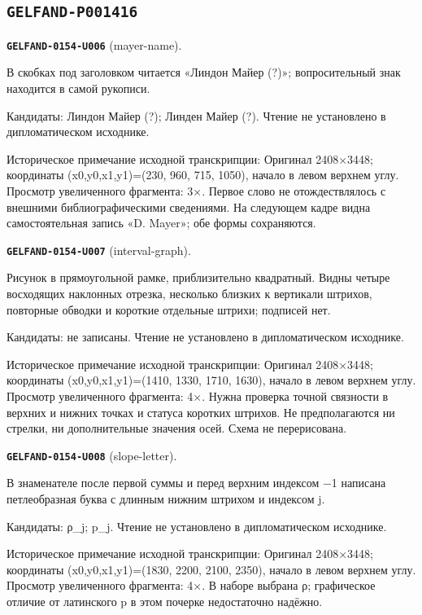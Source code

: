 \subsection*{\texttt{GELFAND-P001416}}
\par\noindent\leavevmode{}\label{GELFAND-0154-U006}\textbf{\texttt{GELFAND-0154-U006}} (mayer-name).\nopagebreak[4]\par
В скобках под заголовком читается «Линдон Майер (?)»; вопросительный знак находится в самой рукописи.\par
Кандидаты: Линдон Майер (?); Линден Майер (?). Чтение не установлено в дипломатическом исходнике.\par
Историческое примечание исходной транскрипции: Оригинал 2408×3448; координаты (x0,y0,x1,y1)=(230, 960, 715, 1050), начало в левом верхнем углу. Просмотр увеличенного фрагмента: 3×. Первое слово не отождествлялось с внешними библиографическими сведениями. На следующем кадре видна самостоятельная запись «D. Mayer»; обе формы сохраняются.\par\medskip
\par\noindent\leavevmode{}\label{GELFAND-0154-U007}\textbf{\texttt{GELFAND-0154-U007}} (interval-graph).\nopagebreak[4]\par
Рисунок в прямоугольной рамке, приблизительно квадратный. Видны четыре восходящих наклонных отрезка, несколько близких к вертикали штрихов, повторные обводки и короткие отдельные штрихи; подписей нет.\par
Кандидаты: не записаны. Чтение не установлено в дипломатическом исходнике.\par
Историческое примечание исходной транскрипции: Оригинал 2408×3448; координаты (x0,y0,x1,y1)=(1410, 1330, 1710, 1630), начало в левом верхнем углу. Просмотр увеличенного фрагмента: 4×. Нужна проверка точной связности в верхних и нижних точках и статуса коротких штрихов. Не предполагаются ни стрелки, ни дополнительные значения осей. Схема не перерисована.\par\medskip
\par\noindent\leavevmode{}\label{GELFAND-0154-U008}\textbf{\texttt{GELFAND-0154-U008}} (slope-letter).\nopagebreak[4]\par
В знаменателе после первой суммы и перед верхним индексом −1 написана петлеобразная буква с длинным нижним штрихом и индексом j.\par
Кандидаты: ρ\_j; p\_j. Чтение не установлено в дипломатическом исходнике.\par
Историческое примечание исходной транскрипции: Оригинал 2408×3448; координаты (x0,y0,x1,y1)=(1830, 2200, 2100, 2350), начало в левом верхнем углу. Просмотр увеличенного фрагмента: 4×. В наборе выбрана ρ; графическое отличие от латинского p в этом почерке недостаточно надёжно.\par\medskip
